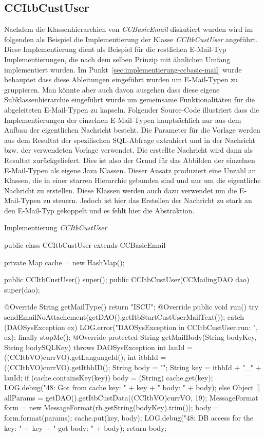 \subsection{CCItbCustUser}
Nachdem die Klassenhierarchien von \emph{CCBasicEmail} diskutiert wurden wird im folgenden als Beispiel die Implementierung der Klasse \emph{CCItbCustUser} angeführt. Diese Implementierung dient als Beispiel für die restlichen E-Mail-Typ Implementierungen, die nach dem selben Prinzip mit ähnlichen Umfang implementiert wurden. Im Punkt~\ref{sec:implementierung-ccbasic-mail} wurde behauptet dass diese Ableitungen eingeführt wurden um E-Mail-Typen zu gruppieren. Man könnte aber auch davon ausgehen dass diese eigene Subklassenhierarchie eingeführt wurde um gemeinsame Funktionalitäten für die abgeleiteten E-Mail-Typen zu kapseln. 
\newline
\newline
Folgender Source-Code illustriert dass die Implementierungen der einzelnen E-Mail-Typen hauptsächlich nur aus dem Aufbau der eigentlichen Nachricht besteht. Die Parameter für die Vorlage werden aus dem Resultat der spezifischen SQL-Abfrage extrahiert und in der Nachricht bzw. der verwendeten Vorlage verwendet. Die erstellte Nachricht wird dann als Resultat zurückgeliefert. Dies ist also der Grund für das Abbilden der einzelnen E-Mail-Typen als eigene Java Klassen. Dieser Ansatz produziert eine Unzahl an Klassen, die in einer starren Hierarchie gebunden sind und nur um die eigentliche Nachricht zu erstellen. Diese Klassen werden auch dazu verwendet um die E-Mail-Typen zu steuern. Jedoch ist hier das Erstellen der Nachricht zu stark an den E-Mail-Typ gekoppelt und es fehlt hier die Abstraktion.
\begin{program}
\caption{Implementierung \emph{CCItbCustUser}}
\label{CCItbCustUser.java}
\begin{JavaCode}
public class CCItbCustUser extends CCBasicEmail {
	
	private Map cache = new HashMap();

	public CCItbCustUser() {
		super();
	}
	public CCItbCustUser(CCMailingDAO dao) {
		super(dao);
	}

	@Override
	String getMailType() {
		return "ISCU";
	}	
	@Override
	public void run() {
		try {
			sendEmailNoAttachement(getDAO().getItbStartCustUserMailText());
		} catch (DAOSysException ex) {
			LOG.error("DAOSysException in CCItbCustUser.run: ",
					   ex);
		} finally {
			stopMe();
		}
	}	
	@Override
	protected String getMailBody(String bodyKey, String bodySQLKey)
		throws DAOSysException {
		int lanId = ((CCItbVO)currVO).getLanguageId();
		int itbhId = ((CCItbVO)currVO).getItbhID();
		String body = "";
		String key = itbhId	+ "_" + lanId;
		if (cache.containsKey(key)) {
			body = (String) cache.get(key);
			LOG.debug("48: Got from cache key: " + key 
					  + " body: " + body);
		} else {
			Object [] allParams = getDAO().getItbCustData((CCItbVO)currVO, 19);
			MessageFormat form = new MessageFormat(rb.getString(bodyKey).trim());
	 		body = form.format(params);
	 		cache.put(key, body);
	 		LOG.debug("48: DB access for the key: " + key
	 				+ " got body: " + body);
		}
		return body;
	}
}
\end{JavaCode}
\end{program}
